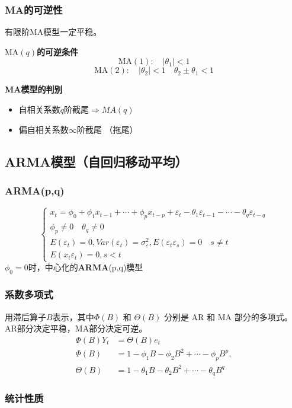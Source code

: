 \documentclass{article} %
\begin{document}
\subsubsection{MA的可逆性}

有限阶$\text{MA}$模型一定平稳。

\textbf{$\text{MA}(q)$的可逆条件}
\[
  \text{MA}(1):\quad |\theta_1|<1
\]
\[
  \text{MA}(2):\quad |\theta_2|<1\quad\theta_2\pm\theta_1<1
\]

\textbf{MA模型的判别}
\begin{itemize}
\item 自相关系数$q$阶截尾$\Rightarrow MA(q)$
\item 偏自相关系数$\infty$阶截尾 （拖尾）
\end{itemize}

\subsection{\textbf{ARMA}模型（自回归移动平均）}

\subsubsection{\textbf{ARMA}(p,q)}
\[
\begin{cases}
x_{t}=\phi_{0}+\phi_{1}x_{t-1}+\cdots+\phi_{p}x_{t-p}+\varepsilon_{t}-\theta_{1}\varepsilon_{t-1}-\cdots-\theta_{q}\varepsilon_{t-q}\\
\phi_{p}\not =0\quad\theta_{q}\neq0\\
E(\varepsilon_{t})=0,Var(\varepsilon_{t})=\sigma_{\varepsilon}^{2},E(\varepsilon_t \varepsilon_{s})=0\quad s\neq t\\
E(x_{t}\varepsilon_{t})=0,s<t
\end{cases}
\]
$\phi_0=0$时，中心化的\textbf{ARMA}(p,q)模型

\subsubsection{系数多项式}
用滞后算子$B$表示，其中\(\Phi(B)\) 和 \(\Theta(B)\) 分别是 AR 和 MA 部分的多项式。AR部分决定平稳，MA部分决定可逆。
\[
\begin{aligned}
\Phi(B)Y_{t}& =\Theta(B)e_t  \\
\Phi(B)& =1-\phi_1B-\phi_2B^2+\cdots-\phi_pB^p,  \\
\Theta(B)& =1-\theta_1B-\theta_2B^2+\cdots-\theta_qB^q
\end{aligned}
\]

\subsubsection{统计性质}
\end{document}
